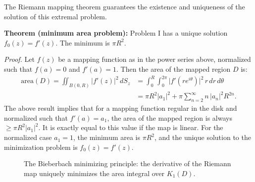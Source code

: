 \documentclass[12pt,a4paper]{article}
\begin{document}
The Riemann mapping theorem guarantees the existence and uniqueness of the solution of this extremal problem.

\begin{theorembox}
\textbf{Theorem (minimum area problem):} Problem I has a unique solution \(f_0(z) = f'(z)\). The minimum is \(\pi R^2\).
\end{theorembox}

\textit{Proof.} Let \(f(z)\) be a mapping function as in the power series above, normalized such that \(f(a) = 0\) and \(f'(a) = 1\). Then the area of the mapped region \(D\) is:
\begin{align*}
\mathrm{area}(D) = \iint_{B(0,R)} |f'(z)|^2 \, dS_z
&= \int_0^R\!\int_0^{2\pi} \bigl|f'(re^{i\theta})\bigr|^2\, r\,dr\,d\theta \\
&= \pi R^2|a_1|^2 + \pi\sum_{n=2}^{\infty} n\,|a_n|^2 R^{2n}.
\end{align*}
The above result implies that for a mapping function regular in the disk and normalized such that \(f'(a) = a_1\), the area of the mapped region is always \(\ge \pi R^2|a_1|^2\). It is exactly equal to this value if the map is linear. For the normalized case \(a_1 = 1\), the minimum area is \(\pi R^2\), and the unique solution to the minimization problem is \(f_0(z) = f'(z)\).

\begin{figure}[H]
\centering
{}
\caption{The Bieberbach minimizing principle: the derivative of the Riemann map uniquely minimizes the area integral over \(K_1(D)\).}
\end{figure}
\end{document}
